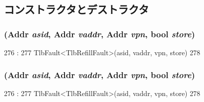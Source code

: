 \subsection{コンストラクタとデストラクタ}
\hypertarget{classMipsISA_1_1TlbRefillFault_a299c6b91a14baa1c8fbcc2b2f003e2bc}{
\subsubsection[{TlbRefillFault}]{ ({\bf Addr} {\em asid}, \/  {\bf Addr} {\em vaddr}, \/  {\bf Addr} {\em vpn}, \/  bool {\em store})}}
\label{classMipsISA_1_1TlbRefillFault_a299c6b91a14baa1c8fbcc2b2f003e2bc}



\begin{DoxyCode}
276                                                                 :
277         TlbFault<TlbRefillFault>(asid, vaddr, vpn, store)
278     {}

\end{DoxyCode}
\hypertarget{classMipsISA_1_1TlbRefillFault_a299c6b91a14baa1c8fbcc2b2f003e2bc}{
\subsubsection[{TlbRefillFault}]{ ({\bf Addr} {\em asid}, \/  {\bf Addr} {\em vaddr}, \/  {\bf Addr} {\em vpn}, \/  bool {\em store})}}
\label{classMipsISA_1_1TlbRefillFault_a299c6b91a14baa1c8fbcc2b2f003e2bc}



\begin{DoxyCode}
276                                                                 :
277         TlbFault<TlbRefillFault>(asid, vaddr, vpn, store)
278     {}

\end{DoxyCode}



